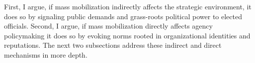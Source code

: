 

First, I argue, if mass mobilization indirectly affects the strategic environment, it does so by signaling public demands and grass-roots political power to elected officials. Second, I argue, if mass mobilization directly affects agency policymaking it does so by evoking norms rooted in organizational identities and reputations. 
The next two subsections address these indirect and direct mechanisms in more depth. 



